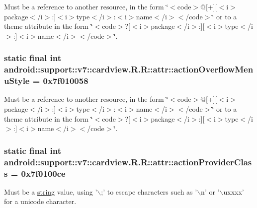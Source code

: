 Must be a reference to another resource, in the form \char`\"{}$<$code$>$@\mbox{[}+\mbox{]}\mbox{[}$<$i$>$package$<$/i$>$:\mbox{]}$<$i$>$type$<$/i$>$:$<$i$>$name$<$/i$>$$<$/code$>$\char`\"{} or to a theme attribute in the form \char`\"{}$<$code$>$?\mbox{[}$<$i$>$package$<$/i$>$:\mbox{]}\mbox{[}$<$i$>$type$<$/i$>$:\mbox{]}$<$i$>$name$<$/i$>$$<$/code$>$\char`\"{}. \hypertarget{classandroid_1_1support_1_1v7_1_1cardview_1_1_r_1_1attr_4644e3145cc7b62b4e0e18ff242e57ec}{
\subsubsection[{actionOverflowMenuStyle}]{\setlength{\rightskip}{0pt plus 5cm}static final int android::support::v7::cardview.R.R::attr::actionOverflowMenuStyle = 0x7f010058}}
\label{classandroid_1_1support_1_1v7_1_1cardview_1_1_r_1_1attr_4644e3145cc7b62b4e0e18ff242e57ec}


Must be a reference to another resource, in the form \char`\"{}$<$code$>$@\mbox{[}+\mbox{]}\mbox{[}$<$i$>$package$<$/i$>$:\mbox{]}$<$i$>$type$<$/i$>$:$<$i$>$name$<$/i$>$$<$/code$>$\char`\"{} or to a theme attribute in the form \char`\"{}$<$code$>$?\mbox{[}$<$i$>$package$<$/i$>$:\mbox{]}\mbox{[}$<$i$>$type$<$/i$>$:\mbox{]}$<$i$>$name$<$/i$>$$<$/code$>$\char`\"{}. \hypertarget{classandroid_1_1support_1_1v7_1_1cardview_1_1_r_1_1attr_301c4c12686ea5d578a79a5d74be76ac}{
\subsubsection[{actionProviderClass}]{\setlength{\rightskip}{0pt plus 5cm}static final int android::support::v7::cardview.R.R::attr::actionProviderClass = 0x7f0100ce}}
\label{classandroid_1_1support_1_1v7_1_1cardview_1_1_r_1_1attr_301c4c12686ea5d578a79a5d74be76ac}


Must be a \hyperlink{classandroid_1_1support_1_1v7_1_1cardview_1_1_r_1_1string}{string} value, using '$\backslash$;' to escape characters such as '$\backslash$n' or '$\backslash$uxxxx' for a unicode character. 

